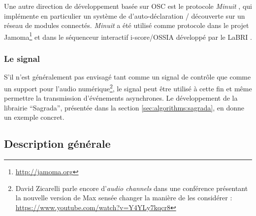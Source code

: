 \noindent Une autre direction de développement basée sur \gls{OSC} est le protocole  \textit{Minuit} \cite{de_la_hogue_jamoma_2011}, qui implémente en particulier un système de d'auto-déclaration / découverte sur un réseau de modules connectés. \textit{Minuit} a été utilisé comme protocole dans le projet Jamoma\footnote{\url{http://jamoma.org}} et dans le séquenceur interactif i-score/OSSIA développé par le LaBRI \cite{celerier_ossia:_2015}.

\subsubsection{Le signal}

\noindent S'il n'est généralement pas envisagé tant comme un signal de contrôle que comme un support pour l'audio numérique\footnote{David Zicarelli parle encore d'\textit{audio channels} dans une conférence présentant la nouvelle version de Max sensée changer la manière de les considérer : \url{https://www.youtube.com/watch?v=Y4YLy7kqcr8}}, le signal peut être utilisé à cette fin et même permettre la transmission d'événements asynchrones. Le développement de la librairie ``Sagrada'', présentée dans la section \ref{sec:algorithms:sagrada}, en donne un exemple concret.

\subsection{Description générale}

